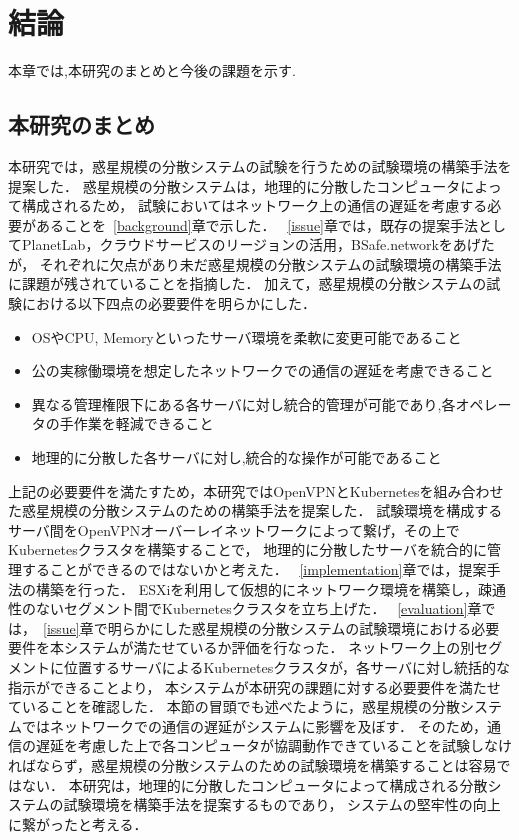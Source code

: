 \chapter{結論}
\label{conclusion}

本章では,本研究のまとめと今後の課題を示す.

\section{本研究のまとめ}
\label{conclusion:conclusion}

本研究では，惑星規模の分散システムの試験を行うための試験環境の構築手法を提案した．
惑星規模の分散システムは，地理的に分散したコンピュータによって構成されるため，
試験においてはネットワーク上の通信の遅延を考慮する必要があることを~\ref{background}章で示した．
~\ref{issue}章では，既存の提案手法としてPlanetLab，クラウドサービスのリージョンの活用，BSafe.networkをあげたが，
それぞれに欠点があり未だ惑星規模の分散システムの試験環境の構築手法に課題が残されていることを指摘した．
加えて，惑星規模の分散システムの試験における以下四点の必要要件を明らかにした．
\begin{itemize}
  \item OSやCPU, Memoryといったサーバ環境を柔軟に変更可能であること
  \item 公の実稼働環境を想定したネットワークでの通信の遅延を考慮できること
  \item 異なる管理権限下にある各サーバに対し統合的管理が可能であり,各オペレータの手作業を軽減できること
  \item 地理的に分散した各サーバに対し,統合的な操作が可能であること
\end{itemize}
上記の必要要件を満たすため，本研究ではOpenVPNとKubernetesを組み合わせた惑星規模の分散システムのための構築手法を提案した．
試験環境を構成するサーバ間をOpenVPNオーバーレイネットワークによって繋げ，その上でKubernetesクラスタを構築することで，
地理的に分散したサーバを統合的に管理することができるのではないかと考えた．
~\ref{implementation}章では，提案手法の構築を行った．
ESXiを利用して仮想的にネットワーク環境を構築し，疎通性のないセグメント間でKubernetesクラスタを立ち上げた．
~\ref{evaluation}章では，~\ref{issue}章で明らかにした惑星規模の分散システムの試験環境における必要要件を本システムが満たせているか評価を行なった．
ネットワーク上の別セグメントに位置するサーバによるKubernetesクラスタが，各サーバに対し統括的な指示ができることより，
本システムが本研究の課題に対する必要要件を満たせていることを確認した．
本節の冒頭でも述べたように，惑星規模の分散システムではネットワークでの通信の遅延がシステムに影響を及ぼす．
そのため，通信の遅延を考慮した上で各コンピュータが協調動作できていることを試験しなければならず，惑星規模の分散システムのための試験環境を構築することは容易ではない．
本研究は，地理的に分散したコンピュータによって構成される分散システムの試験環境を構築手法を提案するものであり，
システムの堅牢性の向上に繋がったと考える．

